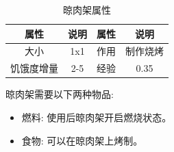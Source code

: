 \begin{table}[H]
    \centering
    \caption{晾肉架属性}
    \setlength{\tabcolsep}{4mm}
    \begin{tabular}{c|cc|c}
        \toprule
        \textbf{属性} & \textbf{说明} & \textbf{属性} & \textbf{说明} \\
        \midrule
        大小 & 1x1 & 作用 & 制作烧烤 \\
        饥饿度增量 & 2-5 & 经验 & 0.35 \\
        \bottomrule
    \end{tabular}
\end{table}

晾肉架需要以下两种物品:
\begin{itemize}
    \item 燃料: 使用后晾肉架开启燃烧状态。
    \item 食物: 可以在晾肉架上烤制。
\end{itemize}

\newpage